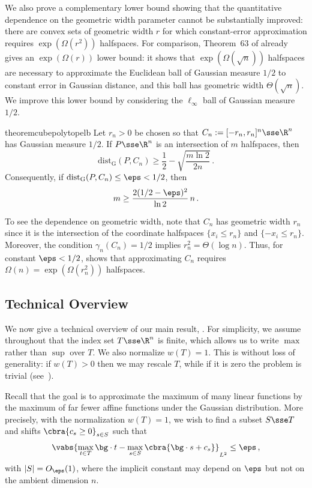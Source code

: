\documentclass[11pt]{article}
\newcommand{\dG}{\mathrm{dist}_{\mathrm{G}}}
\begin{document}
We also prove a complementary lower bound showing that the quantitative dependence on the geometric width parameter cannot be substantially improved: there are convex sets of geometric width $r$ for which constant-error approximation requires $\exp(\Omega(r^2))$ halfspaces. 
For comparison, Theorem~63 of \cite{DNS23-polytope} already gives an $\exp(\Omega(r))$ lower bound: it shows that $\exp(\Omega(\sqrt n))$ halfspaces are necessary to approximate the Euclidean ball of Gaussian measure $1/2$ to constant error in Gaussian distance, and this ball has geometric width $\Theta(\sqrt n)$. 
We improve this lower bound by considering the $\ell_\infty$ ball of Gaussian measure $1/2$. 

\begin{restatable}{theorem}{cubepolytopelb}
\label{thm:gaussian-cube-polytope-lb} 
	Let $r_n>0$ be chosen so that $C_n:=[-r_n,r_n]^n\sse\R^n$ has Gaussian measure $1/2$. 
	If $P\sse\R^n$ is an intersection of $m$ halfspaces, then
	\[
		\dG(P,C_n)
		\geq
		\frac{1}{2}-\sqrt{\frac{m\ln 2}{2n}}\,.
	\] 
	Consequently, if $\dG(P, C_n) \leq \eps<1/2$, then
	\[
		m\geq \frac{2(1/2-\eps)^2}{\ln 2}\,n\,.
	\]
\end{restatable}

To see the dependence on geometric width, note that $C_n$ has geometric width $r_n$ since it is the intersection of the coordinate halfspaces $\{x_i\leq r_n\}$ and $\{-x_i\leq r_n\}$. 
Moreover, the condition $\gamma_n(C_n)=1/2$ implies $r_n^2=\Theta(\log n)$. 
Thus, for constant $\eps<1/2$,  shows that approximating $C_n$ requires $\Omega(n)=\exp(\Omega(r_n^2))$ halfspaces. 

\subsection{Technical Overview}
\label{subsec:technical-overview}

We now give a technical overview of our main result, . 
For simplicity, we assume throughout that the index set $T\sse \R^n$ is finite, which allows us to write $\max$ rather than $\sup$ over $T$. 
We also normalize $w(T) = 1$. 
This is without loss of generality: if $w(T)>0$ then we may rescale $T$, while if it is zero the problem is trivial (see~).  
 
Recall that the goal is to approximate the maximum of many linear functions by the maximum of far fewer affine functions under the Gaussian distribution. 
More precisely, with the normalization $w(T)=1$, we wish to find a subset $S\sse T$ and shifts $\cbra{c_s\geq 0}_{s\in S}$ such that 
\[
	\vabs{
		\max_{t\in T}\bg\cdot t - \max_{s\in S} \cbra{\bg\cdot s + c_s}
	}_{L^2} \leq \eps\,,
\]
with $|S| = O_\eps(1)$, where the implicit constant may depend on $\eps$ but not on the ambient dimension $n$. 
\end{document}

